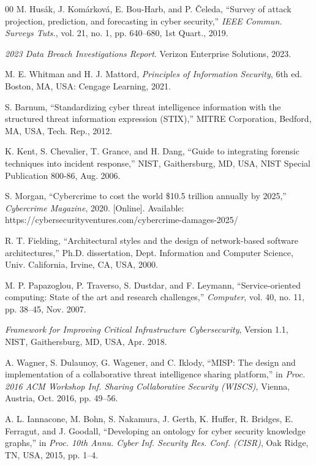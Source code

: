 \documentclass[conference]{IEEEtran}
\begin{document}
\begin{thebibliography}{00}
 M. Husák, J. Komárková, E. Bou-Harb, and P. Čeleda, ``Survey of attack projection, prediction, and forecasting in cyber security,'' \textit{IEEE Commun. Surveys Tuts.}, vol. 21, no. 1, pp. 640--680, 1st Quart., 2019.

 \textit{2023 Data Breach Investigations Report}. Verizon Enterprise Solutions, 2023.

 M. E. Whitman and H. J. Mattord, \textit{Principles of Information Security}, 6th ed. Boston, MA, USA: Cengage Learning, 2021.

 S. Barnum, ``Standardizing cyber threat intelligence information with the structured threat information expression (STIX),'' MITRE Corporation, Bedford, MA, USA, Tech. Rep., 2012.

 K. Kent, S. Chevalier, T. Grance, and H. Dang, ``Guide to integrating forensic techniques into incident response,'' NIST, Gaithersburg, MD, USA, NIST Special Publication 800-86, Aug. 2006.

 S. Morgan, ``Cybercrime to cost the world \$10.5 trillion annually by 2025,'' \textit{Cybercrime Magazine}, 2020. [Online]. Available: https://cybersecurityventures.com/cybercrime-damages-2025/

 R. T. Fielding, ``Architectural styles and the design of network-based software architectures,'' Ph.D. dissertation, Dept. Information and Computer Science, Univ. California, Irvine, CA, USA, 2000.

 M. P. Papazoglou, P. Traverso, S. Dustdar, and F. Leymann, ``Service-oriented computing: State of the art and research challenges,'' \textit{Computer}, vol. 40, no. 11, pp. 38--45, Nov. 2007.

 \textit{Framework for Improving Critical Infrastructure Cybersecurity}, Version 1.1, NIST, Gaithersburg, MD, USA, Apr. 2018.

 A. Wagner, S. Dulaunoy, G. Wagener, and C. Iklody, ``MISP: The design and implementation of a collaborative threat intelligence sharing platform,'' in \textit{Proc. 2016 ACM Workshop Inf. Sharing Collaborative Security (WISCS)}, Vienna, Austria, Oct. 2016, pp. 49--56.

 A. L. Iannacone, M. Bohn, S. Nakamura, J. Gerth, K. Huffer, R. Bridges, E. Ferragut, and J. Goodall, ``Developing an ontology for cyber security knowledge graphs,'' in \textit{Proc. 10th Annu. Cyber Inf. Security Res. Conf. (CISR)}, Oak Ridge, TN, USA, 2015, pp. 1--4.


\end{thebibliography}
\end{document}
